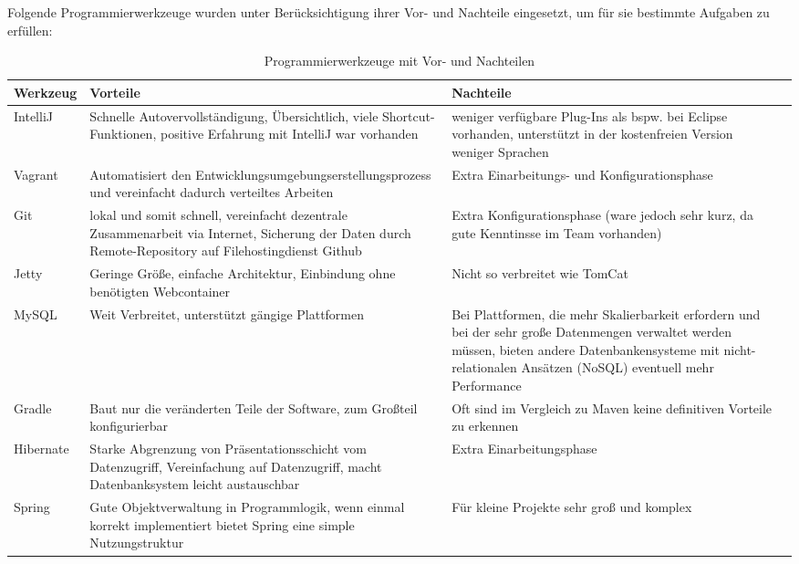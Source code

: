 \documentclass[12pt, oneside, a4paper]{article}		%
\begin{document}
Folgende Programmierwerkzeuge wurden unter Berücksichtigung ihrer Vor- und Nachteile eingesetzt, um für sie bestimmte Aufgaben zu erfüllen:

\begin{table}[ht!]
\centering
\begin{tabular}{| p{1.9cm} | p{6.2cm} | p{6.2cm} | l}
\hline                       
\textbf{Werkzeug}	& \textbf{Vorteile}	& \textbf{Nachteile}	\\
\hline
IntelliJ	& Schnelle Autovervollständigung, Übersichtlich, viele Shortcut-Funktionen, positive Erfahrung mit IntelliJ war vorhanden	& weniger verfügbare Plug-Ins als bspw. bei Eclipse vorhanden, unterstützt in der kostenfreien Version weniger Sprachen	\\
\hline
Vagrant	& Automatisiert den Entwicklungsumgebungserstellungsprozess und vereinfacht dadurch verteiltes Arbeiten	& Extra Einarbeitungs- und Konfigurationsphase	\\
\hline
Git	& lokal und somit schnell, vereinfacht dezentrale Zusammenarbeit via Internet, Sicherung der Daten durch Remote-Repository auf Filehostingdienst Github	& Extra Konfigurationsphase	(ware jedoch sehr kurz, da gute Kenntinsse im Team vorhanden)	\\
\hline
Jetty	& Geringe Größe, einfache Architektur, Einbindung ohne benötigten Webcontainer & Nicht so verbreitet wie TomCat	\\
\hline
MySQL	& Weit Verbreitet, unterstützt gängige Plattformen	& Bei Plattformen, die mehr Skalierbarkeit erfordern und bei der sehr große Datenmengen verwaltet werden müssen, bieten andere Datenbankensysteme mit nicht-relationalen Ansätzen (NoSQL) eventuell mehr Performance \\
\hline
Gradle	& Baut nur die veränderten Teile der Software, zum Großteil konfigurierbar	& Oft sind im Vergleich zu Maven keine definitiven Vorteile zu erkennen	\\
\hline
Hibernate	& Starke Abgrenzung von Präsentationsschicht vom Datenzugriff, Vereinfachung auf Datenzugriff, macht Datenbanksystem leicht austauschbar	& Extra Einarbeitungsphase \\
\hline
Spring	& Gute Objektverwaltung in Programmlogik, wenn einmal korrekt implementiert bietet Spring eine simple Nutzungstruktur	& Für kleine Projekte sehr groß und komplex \\
\hline
\end{tabular}
\caption{Programmierwerkzeuge mit Vor- und Nachteilen}
\label{ProgrammierwerkzeugeMitVorUndNachteilen}
\end{table}
\end{document}
